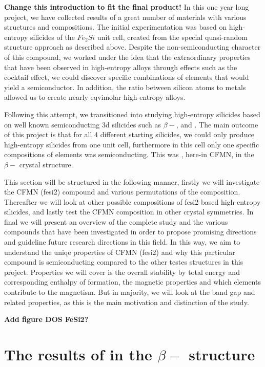\textbf{Change this introduction to fit the final product!}
In this one year long project, we have collected results of a great number of materials with various structures and compositions. The initial experimentation was based on high-entropy silicides of the $Fe_2Si$ unit cell, created from the special quasi-random structure approach as described above. Despite the non-semiconducting character of this compound, we worked under the idea that the extraordinary properties that have been observed in high-entropy alloys through effects such as the cocktail effect, we could discover specific combinations of elements that would yield a semiconductor. In addition, the ratio between silicon atoms to metals allowed us to create nearly eqvimolar high-entropy alloys. 

Following this attempt, we transitioned into studying high-entropy silicides based on well known semiconducting 3d silicides such as $\beta-$,  and . The main outcome of this project is that for all 4 different starting silicides, we could only produce high-entropy silicides from one unit cell, furthermore in this cell only one specific compositions of elements was semiconducting. This was , here-in CFMN, in the $\beta-$  crystal structure.  

This section will be structured in the following manner, firstly we will investigate the CFMN (fesi2) compound and various permutations of the composition. Thereafter we will look at other possible compositions of fesi2 based high-entropy silicides, and lastly test the CFMN composition in other crystal symmetries. In final we will present an overview of the complete study and the various compounds that have been investigated in order to propose promising directions and guideline future research directions in this field. In this way, we aim to understand the uniqe properties of CFMN (fesi2) and why this particular compound is semiconducting compared to the other testes structures in this project. Properties we will cover is the overall stability by total energy and corresponding enthalpy of formation, the magnetic properties and which elements contribute to the magnetism. But in majority, we will look at the band gap and related properties, as this is the main motivation and distinction of the study.

\textbf{Add figure DOS FeSi2?}


\chapter{The results of  in the $\beta-$ structure}
\label{sec:good}

